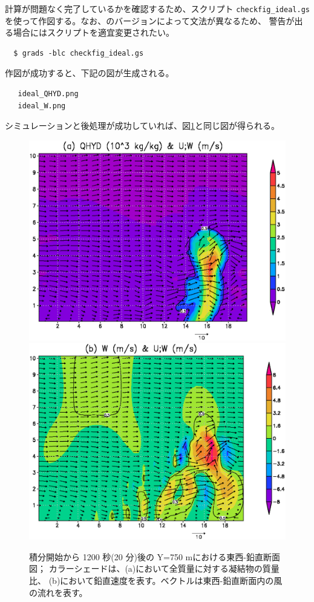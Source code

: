 計算が問題なく完了しているかを確認するため、\grads スクリプト \verb|checkfig_ideal.gs|
を使って作図する。なお、\grads のバージョンによって文法が異なるため、
警告が出る場合には\grads スクリプトを適宜変更されたい。
\begin{verbatim}
  $ grads -blc checkfig_ideal.gs
\end{verbatim}
作図が成功すると、下記の図が生成される。
\begin{verbatim}
   ideal_QHYD.png
   ideal_W.png
\end{verbatim}
シミュレーションと後処理が成功していれば、図\ref{fig_ideal}と同じ図が得られる。

\begin{figure}[t]
\begin{center}
  \includegraphics[width=0.7\hsize]{./figure/ideal_qhyd.eps}\\
  \includegraphics[width=0.7\hsize]{./figure/ideal_W.eps}\\
  \caption{積分開始から 1200 秒(20 分)後の Y=750 mにおける東西-鉛直断面図；
           カラーシェードは、(a)において全質量に対する凝結物の質量比、
           (b)において鉛直速度を表す。ベクトルは東西-鉛直断面内の風の流れを表す。}
  \label{fig_ideal}
\end{center}
\end{figure}


